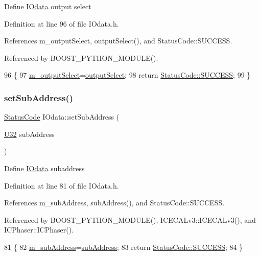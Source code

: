 Define \hyperlink{classIOdata}{I\+Odata} output select 

Definition at line 96 of file I\+Odata.\+h.



References m\+\_\+output\+Select, output\+Select(), and Status\+Code\+::\+S\+U\+C\+C\+E\+SS.



Referenced by B\+O\+O\+S\+T\+\_\+\+P\+Y\+T\+H\+O\+N\+\_\+\+M\+O\+D\+U\+L\+E().


\begin{DoxyCode}
96                                               \{
97     \hyperlink{classIOdata_acc46d71243b542e68277e242effa7f1b}{m\_outputSelect}=\hyperlink{classIOdata_aaa410b57a4607857d45ac6a7cd013307}{outputSelect};
98     \textcolor{keywordflow}{return} \hyperlink{classStatusCode_a6f565cbeadc76d14c72f047e5e85eb4badd0da38d3ba0d922efd1f4619bc37ad8}{StatusCode::SUCCESS};
99   \}
\end{DoxyCode}
\mbox{\label{classIOdata_aeca09aa9a8c2ccc4c3a728b2ddcf4b2a}} 
\subsubsection{\texorpdfstring{set\+Sub\+Address()}{setSubAddress()}}
{\footnotesize\ttfamily \hyperlink{classStatusCode}{Status\+Code} I\+Odata\+::set\+Sub\+Address (\begin{DoxyParamCaption}\item[{\hyperlink{classIOdata_a96fb57f5fcd87b708743abd3c86a5198}{U32}}]{sub\+Address }\end{DoxyParamCaption})\hspace{0.3cm}{\ttfamily [inline]}}

Define \hyperlink{classIOdata}{I\+Odata} subaddress 

Definition at line 81 of file I\+Odata.\+h.



References m\+\_\+sub\+Address, sub\+Address(), and Status\+Code\+::\+S\+U\+C\+C\+E\+SS.



Referenced by B\+O\+O\+S\+T\+\_\+\+P\+Y\+T\+H\+O\+N\+\_\+\+M\+O\+D\+U\+L\+E(), I\+C\+E\+C\+A\+Lv3\+::\+I\+C\+E\+C\+A\+Lv3(), and I\+C\+Phaser\+::\+I\+C\+Phaser().


\begin{DoxyCode}
81                                           \{
82     \hyperlink{classIOdata_a562f84e5cace1e392f1b0fca553fff78}{m\_subAddress}=\hyperlink{classIOdata_a25df48b84364a468373260f823ed9c5f}{subAddress};
83     \textcolor{keywordflow}{return} \hyperlink{classStatusCode_a6f565cbeadc76d14c72f047e5e85eb4badd0da38d3ba0d922efd1f4619bc37ad8}{StatusCode::SUCCESS};
84   \}
\end{DoxyCode}
\mbox{\label{classObject_a89557dbbad5bcaa02652f5d7fa35d20f}} 
